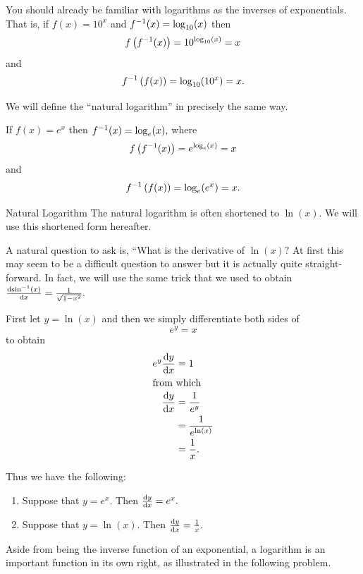 You should already be familiar with logarithms as the inverses of
exponentials. That is, if $f(x)=10^x$ and $f^{-1}(x)=\log_{10}(x)$
then
$$
f\left(f^{-1}(x)\right) = 10^{\log_{10}(x)}=x
$$
and
$$
f^{-1}\left(f(x)\right) = \log_{10}(10^x) = x.
$$

We will define the ``natural logarithm'' in precisely the same way.

\begin{definition}{}
  If $f(x) = e^x$ then $f^{-1}(x) = \log_e(x),$ where 
$$
f\left(f^{-1}(x)\right) = e^{\log_{e}(x)}=x
$$
and
$$
f^{-1}\left(f(x)\right) = \log_{e}(e^x) = x.
$$
\end{definition}
\begin{mynotation}{Natural Logarithm}
  The natural logarithm is often shortened to $\ln(x).$ We will use
  this shortened form hereafter.
\end{mynotation}

A natural question to ask is, ``What is the derivative of $\ln(x)?$ At
first this may seem to be a difficult question to answer but  
it is actually quite straight-forward. In fact, we will use the same
trick that we used to obtain
$\frac{\text{d}{\sin^{-1}(x)}}{\text{d}{x}}=\frac{1}{\sqrt{1-x^2}}.$

First let $y=\ln(x)$ and then we simply differentiate both sides of 
$$
e^y=x
$$
to obtain
\begin{align*}
  e^y\frac{\text{d}{y}}{\text{d}{x}} &=1\\
  \intertext{from which }
  \frac{\text{d}{y}}{\text{d}{x}}    &= \frac{1}{e^y}\\
                 &= \frac{1}{e^{\ln(x)}}\\
                  &= \frac{1}{x}.
\end{align*}

Thus we have the following:
\begin{mytheorem}
  \begin{enumerate}
  \item Suppose that $y=e^x.$ Then $\frac{\text{d}{y}}{\text{d}{x}} = e^x.$
  \item Suppose that $y=\ln(x).$ Then $\frac{\text{d}{y}}{\text{d}{x}} = \frac1x.$
  \end{enumerate}
\end{mytheorem}

Aside from being the inverse function of an exponential, a logarithm
is an important function in its own right, as illustrated in the
following problem.  

